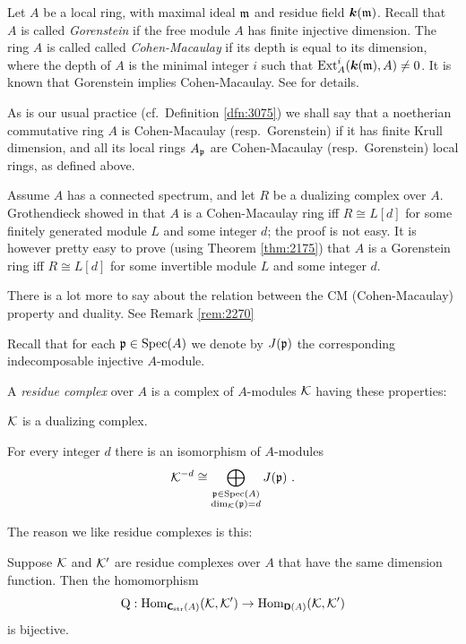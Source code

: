 \begin{exa} \label{2255}
Let $A$ be a local ring, with maximal ideal $\mathfrak{m}$ and residue field  
$\boldsymbol{k}(\mathfrak{m})$. Recall that $A$ is called {\em Gorenstein} if the free 
module $A$ has finite injective dimension. The ring $A$ is called called {\em 
Cohen-Macaulay} if its depth is equal to its dimension, where the depth of $A$ 
is the minimal integer $i$ such that 
$\operatorname{Ext}^i_A(\boldsymbol{k}(\mathfrak{m}), A) \neq 0$. It is known that Gorenstein implies 
Cohen-Macaulay. See \cite{Mats} for details. 

As is our usual practice (cf.\ Definition \ref{dfn:3075}) we shall say that 
a noetherian commutative ring $A$ is Cohen-Macaulay (resp.\ Gorenstein) if it 
has finite Krull dimension, and all its local rings $A_{\mathfrak{p}}$ are Cohen-Macaulay 
(resp.\ Gorenstein) local rings, as defined above. 

Assume $A$ has a connected spectrum, and let $R$ be a dualizing complex over 
$A$. Grothendieck showed in \cite[Section V.9]{RD} that $A$ is a Cohen-Macaulay 
ring iff $R \cong L[d]$ for some finitely generated module $L$ and some integer 
$d$; the proof is not easy. It is however pretty easy to prove (using Theorem 
\ref{thm:2175}) that $A$ is a Gorenstein ring iff $R \cong L[d]$ for some 
invertible module $L$ and some integer $d$. 

There is a lot more to say about the relation between the CM (Cohen-Macaulay) 
property and duality. See Remark \ref{rem:2270}
\end{exa}

Recall that for each $\mathfrak{p} \in \operatorname{Spec}(A)$ we denote by $J(\mathfrak{p})$ the 
corresponding indecomposable injective $A$-module. 

\begin{dfn} \label{dfn:2236}
A {\em residue complex} 
over $A$ is a complex of $A$-modules $\mathcal{K}$ having these properties:
\begin{itemize}
 $\mathcal{K}$ is a dualizing complex. 

 For every integer $d$ there is an isomorphism of $A$-modules 
\[ \mathcal{K}^{-d} \cong 
\bigoplus_{\substack{ \mathfrak{p} \in \operatorname{Spec}(A) \\  
\operatorname{dim}_{\mathcal{K}}(\mathfrak{p})  = d }}  J(\mathfrak{p}) \ . \]
\end{itemize}
\end{dfn}

The reason we like residue complexes is this:

\begin{thm} \label{thm:2240}
Suppose $\mathcal{K}$ and $\mathcal{K}'$ are residue complexes over $A$ that have the same 
dimension function. Then the homomorphism 
\[ \operatorname{Q} : \operatorname{Hom}_{\boldsymbol{\mathsf{C}}_{\mathrm{str}}(A)}(\mathcal{K}, \mathcal{K}') \to 
\operatorname{Hom}_{\boldsymbol{\mathsf{D}}(A)}(\mathcal{K}, \mathcal{K}') \]
is bijective. 
\end{thm}

